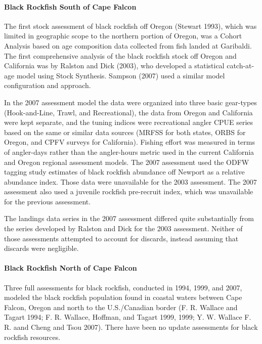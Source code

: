 \documentclass[11pt,
  english,
  letterpaper,
]{article}
\begin{document}
\hypertarget{black-rockfish-south-of-cape-falcon}{%
\paragraph{Black Rockfish South of Cape Falcon}\label{black-rockfish-south-of-cape-falcon}}

The first stock assessment of black rockfish off Oregon (Stewart 1993), which was limited in geographic scope to the northern portion of Oregon, was a Cohort Analysis based on age composition data collected from fish landed at Garibaldi. The first comprehensive analysis of the black rockfish stock off Oregon and California was by Ralston and Dick (2003), who developed a statistical catch-at-age model using Stock Synthesis. Sampson (2007) used a similar model configuration and approach.

In the 2007 assessment model the data were organized into three basic gear-types (Hook-and-Line, Trawl, and Recreational), the data from Oregon and California were kept separate, and the tuning indices were recreational angler CPUE series based on the same or similar data sources (MRFSS for both states, ORBS for Oregon, and CPFV surveys for California). Fishing effort was measured in terms of angler-days rather than the angler-hours metric used in the current California and Oregon regional assessment models. The 2007 assessment used the ODFW tagging study estimates of black rockfish abundance off Newport as a relative abundance index. Those data were unavailable for the 2003 assessment. The 2007 assessment also used a juvenile rockfish pre-recruit index, which was unavailable for the previous assessment.

The landings data series in the 2007 assessment differed quite substantially from the series developed by Ralston and Dick for the 2003 assessment. Neither of those assessments attempted to account for discards, instead assuming that discards were negligible.

\hypertarget{black-rockfish-north-of-cape-falcon}{%
\paragraph{Black Rockfish North of Cape Falcon}\label{black-rockfish-north-of-cape-falcon}}

Three full assessments for black rockfish, conducted in 1994, 1999, and 2007, modeled the black rockfish population found in coastal waters between Cape Falcon, Oregon and north to the U.S./Canadian border (F. R. Wallace and Tagart 1994; F. R. Wallace, Hoffman, and Tagart 1999, 1999; Y. W. Wallace F. R. aand Cheng and Tsou 2007). There have been no update assessments for black rockfish resources.
\end{document}
